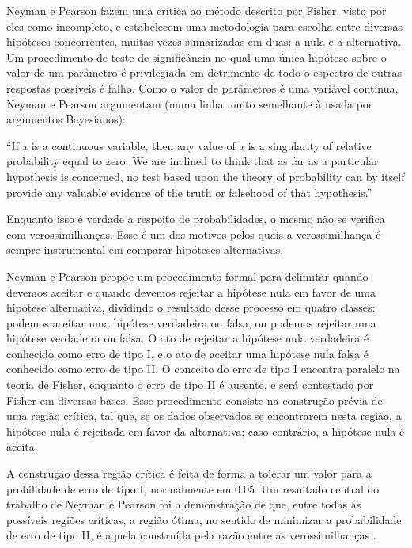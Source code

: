 Neyman e Pearson fazem uma crítica ao método descrito por Fisher, visto por eles como incompleto, e estabelecem uma metodologia
para escolha entre diversas hipóteses concorrentes, muitas vezes sumarizadas em duas: a nula e a alternativa.
Um procedimento de teste de significância
no qual uma única hipótese sobre o valor de um parâmetro é privilegiada em detrimento de todo o espectro de outras respostas
possíveis é falho. Como o valor de parâmetros é uma variável contínua, Neyman e Pearson argumentam (numa linha muito semelhante
à usada por argumentos Bayesianos):

``If {\em x} is a continuous variable, then any value of {\em x} is a singularity of relative probability equal to zero. We are
inclined to think that as far as a particular hypothesis is concerned, no test based upon the theory of probability can by
itself provide any valuable evidence of the truth or falsehood of that hypothesis.'' \citep{Neyman1933}

Enquanto isso é verdade a respeito de probabilidades, o mesmo não se verifica com verossimilhanças. Esse é um dos motivos
pelos quais a verossimilhança é sempre instrumental em comparar hipóteses alternativas.

Neyman e Pearson propõe um procedimento formal para delimitar quando devemos aceitar e quando devemos rejeitar a hipótese
nula em favor de uma hipótese alternativa, dividindo o resultado desse processo em quatro classes: podemos aceitar uma hipótese
verdadeira ou falsa, ou podemos rejeitar uma hipótese verdadeira ou falsa. O ato de rejeitar a hipótese nula verdadeira
é conhecido como erro de tipo I, e o ato de aceitar uma hipótese nula falsa é conhecido como erro de tipo II. O conceito do 
erro de tipo I encontra paralelo na teoria de Fisher, enquanto o erro de tipo II é ausente, e será contestado por Fisher em
diversas bases. Esse procedimento consiste na construção prévia de uma região crítica, tal que, se os dados observados se
encontrarem nesta região, a hipótese nula é rejeitada em favor da alternativa; caso contrário, a hipótese nula é aceita.

A construção dessa região crítica é feita de forma a tolerar um valor para a probilidade de erro de tipo I, normalmente em
0.05. Um resultado central do trabalho de Neyman e Pearson foi a demonstração de que, entre todas as possíveis regiões críticas,
a região ótima, no sentido de minimizar a probabilidade de erro de tipo II, é aquela construída pela razão entre as 
verossimilhanças \citep{Neyman1933}. 

